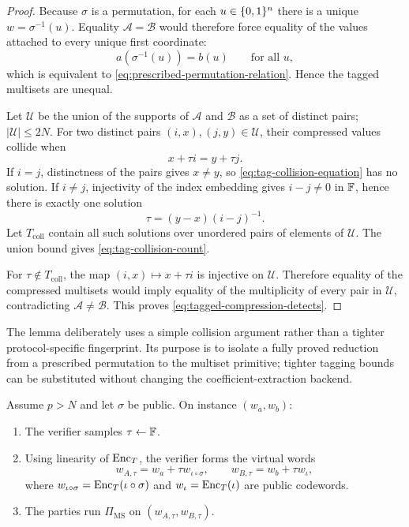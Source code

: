 \begin{proof}
Because $\sigma$ is a permutation, for each $u\in\{0,1\}^n$ there is a unique $w=\sigma^{-1}(u)$.  Equality $\mathcal A=\mathcal B$ would therefore force equality of the values attached to every unique first coordinate:
\[
  a(\sigma^{-1}(u))=b(u)
  \qquad\text{for all }u,
\]
which is equivalent to \eqref{eq:prescribed-permutation-relation}.  Hence the tagged multisets are unequal.

Let $\mathcal U$ be the union of the supports of $\mathcal A$ and $\mathcal B$ as a set of distinct pairs; $|\mathcal U|\le2N$.  For two distinct pairs $(i,x),(j,y)\in\mathcal U$, their compressed values collide when
\begin{equation}
  x+\tau i=y+\tau j.
  \label{eq:tag-collision-equation}
\end{equation}
If $i=j$, distinctness of the pairs gives $x\ne y$, so \eqref{eq:tag-collision-equation} has no solution.  If $i\ne j$, injectivity of the index embedding gives $i-j\ne0$ in $\mathbb{F}$, hence there is exactly one solution
\[
  \tau=(y-x)(i-j)^{-1}.
\]
Let $T_{\mathrm{coll}}$ contain all such solutions over unordered pairs of elements of $\mathcal U$.  The union bound gives \eqref{eq:tag-collision-count}.

For $\tau\notin T_{\mathrm{coll}}$, the map $(i,x)\mapsto x+\tau i$ is injective on $\mathcal U$.  Therefore equality of the compressed multisets would imply equality of the multiplicity of every pair in $\mathcal U$, contradicting $\mathcal A\ne\mathcal B$.  This proves \eqref{eq:tagged-compression-detects}.
\end{proof}

The lemma deliberately uses a simple collision argument rather than a tighter protocol-specific fingerprint.  Its purpose is to isolate a fully proved reduction from a prescribed permutation to the multiset primitive; tighter tagging bounds can be substituted without changing the coefficient-extraction backend.

\begin{definition}
\label{def:tagged-permutation-protocol}
Assume $p>N$ and let $\sigma$ be public.  On instance $(w_a,w_b)$:
\begin{enumerate}[label=\textnormal{\arabic*.},leftmargin=*]
  \item The verifier samples $\tau\leftarrow\mathbb{F}$.
  \item Using linearity of $\operatorname{Enc}_T$, the verifier forms the virtual words
  \begin{equation}
    w_{A,\tau}
    =w_a+\tau w_{\iota\circ\sigma},
    \qquad
    w_{B,\tau}
    =w_b+\tau w_{\iota},
    \label{eq:tagged-virtual-words}
  \end{equation}
  where $w_{\iota\circ\sigma}=\operatorname{Enc}_T(\iota\circ\sigma)$ and $w_{\iota}=\operatorname{Enc}_T(\iota)$ are public codewords.
  \item The parties run $\Pi_{\mathrm{MS}}$ on $(w_{A,\tau},w_{B,\tau})$.
\end{enumerate}
\end{definition}

